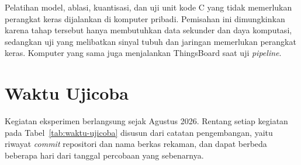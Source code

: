 Pelatihan model, ablasi, kuantisasi, dan uji unit kode C yang tidak memerlukan perangkat keras dijalankan di komputer pribadi. Pemisahan ini dimungkinkan karena tahap tersebut hanya membutuhkan data sekunder dan daya komputasi, sedangkan uji yang melibatkan sinyal tubuh dan jaringan memerlukan perangkat keras. Komputer yang sama juga menjalankan ThingsBoard saat uji \textit{pipeline}.


\section{Waktu Ujicoba}

Kegiatan eksperimen berlangsung sejak Agustus 2026. Rentang setiap kegiatan pada Tabel~\ref{tab:waktu-ujicoba} disusun dari catatan pengembangan, yaitu riwayat \textit{commit} repositori dan nama berkas rekaman, dan dapat berbeda beberapa hari dari tanggal percobaan yang sebenarnya.

